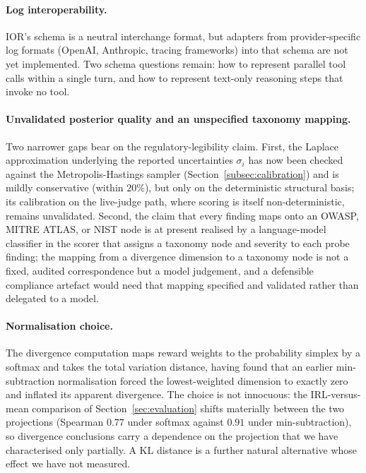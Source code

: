 \paragraph{Log interoperability.}
IOR's schema is a neutral interchange format, but adapters from provider-specific
log formats (OpenAI, Anthropic, tracing frameworks) into that schema are not yet
implemented. Two schema questions remain: how to represent parallel tool calls
within a single turn, and how to represent text-only reasoning steps that invoke no
tool.

\paragraph{Unvalidated posterior quality and an unspecified taxonomy mapping.}
Two narrower gaps bear on the regulatory-legibility claim. First, the Laplace
approximation underlying the reported uncertainties $\sigma_i$ has now been checked
against the Metropolis-Hastings sampler (Section~\ref{subsec:calibration}) and is
mildly conservative (within $20\%$), but only on the deterministic structural basis;
its calibration on the live-judge path, where scoring is itself non-deterministic,
remains unvalidated. Second, the claim that every finding maps onto an OWASP, MITRE ATLAS,
or NIST node is at present realised by a language-model classifier in the scorer
that assigns a taxonomy node and severity to each probe finding; the mapping from a
divergence dimension to a taxonomy node is not a fixed, audited correspondence but a
model judgement, and a defensible compliance artefact would need that mapping
specified and validated rather than delegated to a model.

\paragraph{Normalisation choice.}
The divergence computation maps reward weights to the probability simplex by a
softmax and takes the total variation distance, having found that an earlier
min-subtraction normalisation forced the lowest-weighted dimension to exactly zero
and inflated its apparent divergence. The choice is not innocuous: the
IRL-versus-mean comparison of Section~\ref{sec:evaluation} shifts materially between
the two projections (Spearman $0.77$ under softmax against $0.91$ under
min-subtraction), so divergence conclusions carry a dependence on the projection
that we have characterised only partially. A KL distance is a further natural
alternative whose effect we have not measured.

